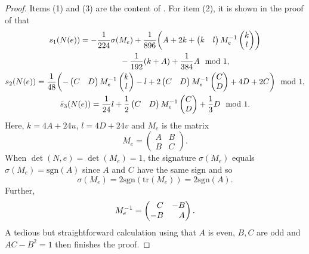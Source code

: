 \documentclass[10pt,a4paper]{amsart}
\numberwithin{equation}{section}
\theoremstyle{definition}
\numberwithin{table}{section}
\begin{document}
\begin{proof}
	Items (1) and (3) are the content of \cite[Lemma~3]{Xu25}. For item (2), it is shown in the proof of \cite[Lemma~3]{Xu25} that
	\begin{gather*}
		s_1(N(e))= -\frac{1}{224}\sigma(M_e)+\frac{1}{896}\biggl(A+2k+\begin{pmatrix}
			k & l
		\end{pmatrix}M_e^{-1}\begin{pmatrix}
			k \\ l
		\end{pmatrix}\biggr)\\
		\hphantom{s_1(N(e))=}{} -\frac{1}{192}(k+A)+\frac{1}{384}A\mod 1,\\
		s_2(N(e))= \frac{1}{48}\biggl(-\begin{pmatrix}
			C & D
		\end{pmatrix}M_e^{-1}\begin{pmatrix}
			k\\l
		\end{pmatrix}-l+2\begin{pmatrix}
			C & D
		\end{pmatrix}M_e^{-1}\begin{pmatrix}
			C\\D
		\end{pmatrix}+4D+2C \biggr)\mod 1,\\
		\tilde{s}_3(N(e))= \frac{1}{24}l+\frac{1}{2}\begin{pmatrix}
			C & D
		\end{pmatrix}M_e^{-1}\begin{pmatrix}
			C\\D
		\end{pmatrix}+\frac{1}{3}D\mod 1.
	\end{gather*}
	Here, $k=4A+24u$, $l=4D+24v$ and $M_e$ is the matrix
	\[ M_e=\begin{pmatrix}
		A & B\\B & C
	\end{pmatrix}. \]
	When $\det(N,e)=\det(M_e)=1$, the signature $\sigma(M_e)$ equals $\sigma(M_e)=\mathrm{sgn}(A)$ since $A$ and $C$ have the same sign and so
	\[ \sigma(M_e)=2\mathrm{sgn}(\mathrm{tr}(M_e))=2\mathrm{sgn}(A). \]
	Further,
	\[ M_e^{-1}=\begin{pmatrix}
		\hphantom{-}C & -B\\-B& \hphantom{-}A\end{pmatrix}. \]
	A tedious but straightforward calculation using that $A$ is even, $B,C$ are odd and $AC-B^2=1$ then finishes the proof.
\end{proof}	
\end{document}
